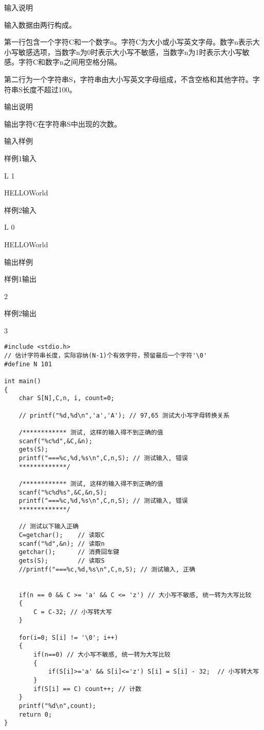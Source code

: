 输入说明	

输入数据由两行构成。

第一行包含一个字符C和一个数字n。字符C为大小或小写英文字母。数字n表示大小写敏感选项，当数字n为0时表示大小写不敏感，当数字n为1时表示大小写敏感。字符C和数字n之间用空格分隔。

第二行为一个字符串S，字符串由大小写英文字母组成，不含空格和其他字符。字符串S长度不超过100。

输出说明
	
输出字符C在字符串S中出现的次数。

输入样例

样例1输入

L 1

HELLOWorld

样例2输入

L 0

HELLOWorld

输出样例

样例1输出	

2

样例2输出

3

\begin{lstlisting}
#include <stdio.h>
// 估计字符串长度，实际容纳(N-1)个有效字符，预留最后一个字符'\0'
#define N 101 

int main()
{
	char S[N],C,n, i, count=0;
	
	// printf("%d,%d\n",'a','A'); // 97,65 测试大小写字母转换关系 
	
	/************ 测试, 这样的输入得不到正确的值 
	scanf("%c%d",&C,&n);
	gets(S);
	printf("===%c,%d,%s\n",C,n,S); // 测试输入, 错误 
	*************/ 
	
	/************ 测试, 这样的输入得不到正确的值
	scanf("%c%d%s",&C,&n,S);
	printf("===%c,%d,%s\n",C,n,S); // 测试输入, 错误 
	*************/ 
	
	// 测试以下输入正确 
	C=getchar();    // 读取C 
	scanf("%d",&n); // 读取n 
	getchar();      // 消费回车键 
	gets(S);        // 读取S 
	//printf("===%c,%d,%s\n",C,n,S); // 测试输入, 正确 
	
	
	if(n == 0 && C >= 'a' && C <= 'z') // 大小写不敏感, 统一转为大写比较 
	{
		C = C-32; // 小写转大写 
	} 
	
	for(i=0; S[i] != '\0'; i++) 
	{
		if(n==0) // 大小写不敏感, 统一转为大写比较 
		{
			if(S[i]>='a' && S[i]<='z') S[i] = S[i] - 32;  // 小写转大写 
		}
		if(S[i] == C) count++; // 计数 
	}
	printf("%d\n",count);
	return 0;
} 
\end{lstlisting}


